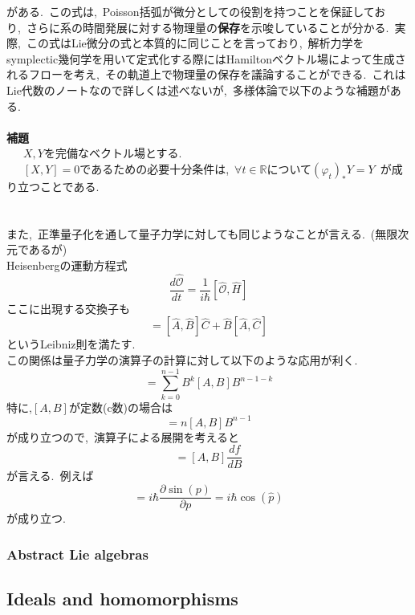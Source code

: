 \documentclass[uplatex,dvipdfmx]{jsarticle}
\begin{document}
がある.~この式は,~Poisson括弧が微分としての役割を持つことを保証しており,~さらに系の時間発展に対する物理量の\textbf{保存}を示唆していることが分かる.~実際,~この式はLie微分の式と本質的に同じことを言っており,~解析力学をsymplectic幾何学を用いて定式化する際にはHamiltonベクトル場によって生成されるフローを考え,~その軌道上で物理量の保存を議論することができる.~これはLie代数のノートなので詳しくは述べないが,~多様体論で以下のような補題がある.\\\\
\textbf{補題}\\
~~~$X,Y$を完備なベクトル場とする.\\
~~~$[X,Y]=0$であるための必要十分条件は,~$\forall t\in \mathbb
R$について$(\varphi_t)_*Y=Y$~が成り立つことである.\\\\\\
また,~正準量子化を通して量子力学に対しても同じようなことが言える.~(無限次元であるが)\\
Heisenbergの運動方程式
\begin{equation*}
    \frac{d \hat{\mathcal{O}}}{dt}=\frac{1}{i\hbar}[\hat{\mathcal{O}},\hat{H}]
\end{equation*}
ここに出現する交換子も
\begin{equation*}
    [\hat{A}, \hat{B}\hat{C}] = [\hat{A}, \hat{B}]\hat{C} + \hat{B}[\hat{A}, \hat{C}]
\end{equation*}
というLeibniz則を満たす.\\
この関係は量子力学の演算子の計算に対して以下のような応用が利く.
\begin{equation*}
    [A, B^n] = \sum_{k=0}^{n-1} B^k [A, B] B^{n-1-k}
\end{equation*}
特に,$[A,B]$が定数(c数)の場合は
\begin{equation*}
    [A, B^n] = n [A, B] B^{n-1}
\end{equation*}
が成り立つので,~演算子による展開を考えると
\begin{equation*}
    [A, f(B)] = [A, B] \frac{df}{dB}
\end{equation*}
が言える.~例えば
\begin{equation*}
    [\hat{x}, \sin(\hat{p})] = i\hbar \frac{\partial \sin({p})}{\partial p}=i\hbar \cos(\hat{p})
\end{equation*}
が成り立つ.
\newpage
\subsubsection{Abstract Lie algebras}
\subsection{Ideals and homomorphisms}
\end{document}
